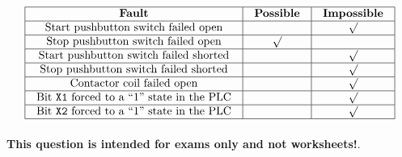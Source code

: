 






$$\vbox{\offinterlineskip
\halign{\strut
\vrule \quad\hfil # \ \hfil & 
\vrule \quad\hfil # \ \hfil & 
\vrule \quad\hfil # \ \hfil \vrule \cr
\noalign{\hrule}
%
{\bf Fault} & {\bf Possible} & {\bf Impossible} \cr
%
\noalign{\hrule}
%
Start pushbutton switch failed open &  & $\surd$ \cr
%
\noalign{\hrule}
%
Stop pushbutton switch failed open & $\surd$ &  \cr
%
\noalign{\hrule}
%
Start pushbutton switch failed shorted &  & $\surd$ \cr
%
\noalign{\hrule}
%
Stop pushbutton switch failed shorted &  & $\surd$ \cr
%
\noalign{\hrule}
%
Contactor coil failed open &  & $\surd$ \cr
%
\noalign{\hrule}
%
Bit {\tt X1} forced to a ``1'' state in the PLC &  & $\surd$ \cr
%
\noalign{\hrule}
%
Bit {\tt X2} forced to a ``1'' state in the PLC &  & $\surd$ \cr
%
\noalign{\hrule}
} %
}$$ %








{\bf This question is intended for exams only and not worksheets!}.


